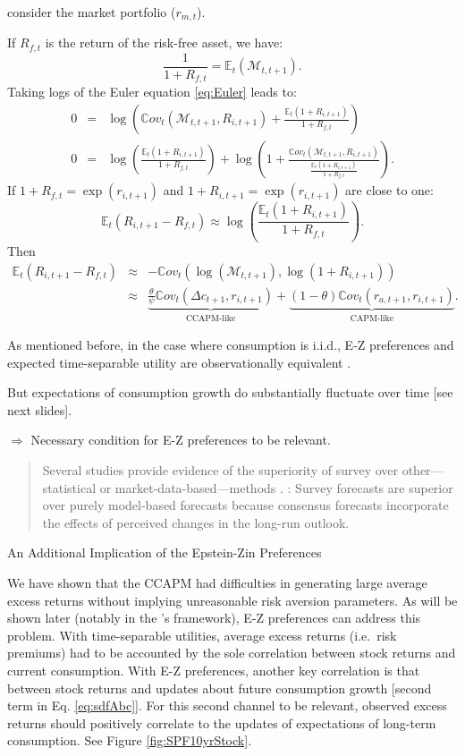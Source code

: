 \documentclass[
  12pt,
]{book}
\theoremstyle{definition}
\theoremstyle{definition}
\theoremstyle{definition}
\theoremstyle{definition}
\theoremstyle{remark}
\begin{document}
\citet{Bansal_Yaron_2004} consider the market portfolio (\(r_{m,t}\)).

If \(R_{f,t}\) is the return of the risk-free asset, we have:
\[
\frac{1}{1+R_{f,t}} = \mathbb{E}_t(\mathcal{M}_{t,t+1}).
\]
Taking logs of the Euler equation \eqref{eq:Euler} leads to:
\begin{eqnarray*}
0 &=& \log \left( \mathbb{C}ov_t(\mathcal{M}_{t,t+1},R_{i,t+1}) + \frac{\mathbb{E}_t(1+R_{i,t+1})}{1+R_{f,t}} \right)\\
0 &=& \log \left(  \frac{\mathbb{E}_t(1+R_{i,t+1})}{1+R_{f,t}} \right) + \log \left( 1 + \frac{\mathbb{C}ov_t(\mathcal{M}_{t,t+1},R_{i,t+1})}{\frac{\mathbb{E}_t(1+R_{i,t+1})}{1+R_{f,t}}} \right).
\end{eqnarray*}
If \(1+R_{f,t}=\exp(r_{i,t+1})\) and \(1+R_{i,t+1}=\exp(r_{i,t+1})\) are close to one:
\[
\mathbb{E}_t(R_{i,t+1}-R_{f,t}) \approx\log \left(  \frac{\mathbb{E}_t(1+R_{i,t+1})}{1+R_{f,t}} \right).
\]
Then
\begin{eqnarray*}
\mathbb{E}_t(R_{i,t+1}-R_{f,t}) &\approx& - \mathbb{C}ov_t \left(
\log(\mathcal{M}_{t,t+1}),
\log(1+R_{i,t+1}) \right)\\
&\approx& \underbrace{\frac{\theta}{\psi} \mathbb{C}ov_t( \Delta c_{t+1},r_{i,t+1})}_{\mbox{CCAPM-like}} + \underbrace{(1-\theta) \mathbb{C}ov_t( r_{a,t+1},r_{i,t+1})}_{\mbox{CAPM-like}}.
\end{eqnarray*}

As mentioned before, in the case where consumption is i.i.d., E-Z preferences and expected time-separable utility are observationally equivalent \citep{Kocherlakota_1990}.

But expectations of consumption growth do substantially fluctuate over time {[}see next slides{]}.

\(\Rightarrow\) Necessary condition for E-Z preferences to be relevant.

\begin{quote}
Several studies provide evidence of the superiority of survey over other---statistical or market-data-based---methods \citep[e.g.@Ang\_Bekaert\_Wei\_2007 or][]{Croushore_2010}. \citet{Clements_2010}: Survey forecasts are superior over purely model-based forecasts because consensus forecasts incorporate the effects of perceived changes in the long-run outlook.
\end{quote}

An Additional Implication of the Epstein-Zin Preferences

We have shown that the CCAPM had difficulties in generating large average excess returns without implying unreasonable risk aversion parameters.
As will be shown later (notably in the \citet{Bansal_Yaron_2004}'s framework), E-Z preferences can address this problem.
With time-separable utilities, average excess returns (i.e.~risk premiums) had to be accounted by the sole correlation between stock returns and current consumption.
With E-Z preferences, another key correlation is that between stock returns and updates about future consumption growth {[}second term in Eq. \eqref{eq:sdfAbc}{]}.
For this second channel to be relevant, observed excess returns should positively correlate to the updates of expectations of long-term consumption. See Figure \ref{fig:SPF10yrStock}.
\end{document}

